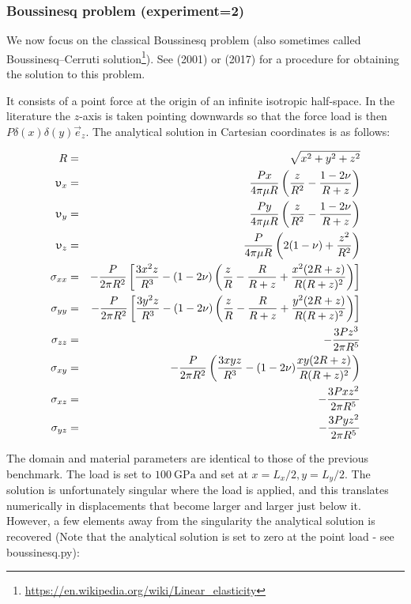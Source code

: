 \subsubsection*{Boussinesq problem (experiment=2)}

We now focus on the classical Boussinesq problem (also sometimes called Boussinesq–Cerruti 
solution\footnote{\url{https://en.wikipedia.org/wiki/Linear_elasticity}}).
See \textcite{selv01} (2001) or \textcite{nwom17} (2017) 
for a procedure for obtaining the solution to this problem.

It consists of a point force at the origin of an infinite isotropic half-space. In the literature the 
$z$-axis is taken pointing downwards so that the force load is then $P\delta(x)\delta(y) \vec{e}_z$.
The analytical solution in Cartesian coordinates is as follows:

\begin{eqnarray}
R&=&\sqrt{x^2+y^2+z^2} \nonumber\\
\upupsilon_x &=& \frac{Px}{4\pi \mu R} 
\left(\frac{z}{R^2}-\frac{1-2\nu}{R+z}\right) \nonumber\\
\upupsilon_y &=& \frac{Py}{4\pi \mu R} 
\left(\frac{z}{R^2}-\frac{1-2\nu}{R+z}\right) \nonumber\\
\upupsilon_z &=& \frac{P}{4\pi \mu R} 
\left(2(1-\nu)+\frac{z^2}{R^2}\right) \nonumber\\
\sigma_{xx} &=& -\frac{P}{2\pi R^2}
\left[\frac{3x^2z}{R^3}-(1-2\nu)\left(\frac{z}{R}-\frac{R}{R+z} + \frac{x^2 (2R+z)}{R(R+z)^2}\right)
\right]\nonumber\\
\sigma_{yy} &=& -\frac{P}{2\pi R^2}
\left[\frac{3y^2z}{R^3}-(1-2\nu)\left(\frac{z}{R}-\frac{R}{R+z} + \frac{y^2 (2R+z)}{R(R+z)^2}\right)
\right]\nonumber\\
\sigma_{zz} &=& -\frac{3Pz^3}{2\pi R^5} \nonumber\\
\sigma_{xy} &=& -\frac{P}{2\pi R^2} 
\left(
\frac{3xyz}{R^3} - (1-2\nu) \frac{xy(2R+z)}{R(R+z)^2}
\right) \nonumber\\
\sigma_{xz} &=& -\frac{3Pxz^2}{2\pi R^5} \nonumber\\
\sigma_{yz} &=& -\frac{3Pyz^2}{2\pi R^5} \nonumber
\end{eqnarray}

The domain and material parameters are identical to those of the previous benchmark. The load is 
set to $\SI{100}{\giga\pascal}$ and set at $x=L_x/2,y=L_y/2$.
The solution is unfortunately singular where the load is applied, and this translates numerically in displacements
that become larger and larger just below it. However, a few elements away from the singularity the 
analytical solution is recovered (Note that the analytical solution is set to zero at the point load - 
see {\pythonfile boussinesq.py}):


